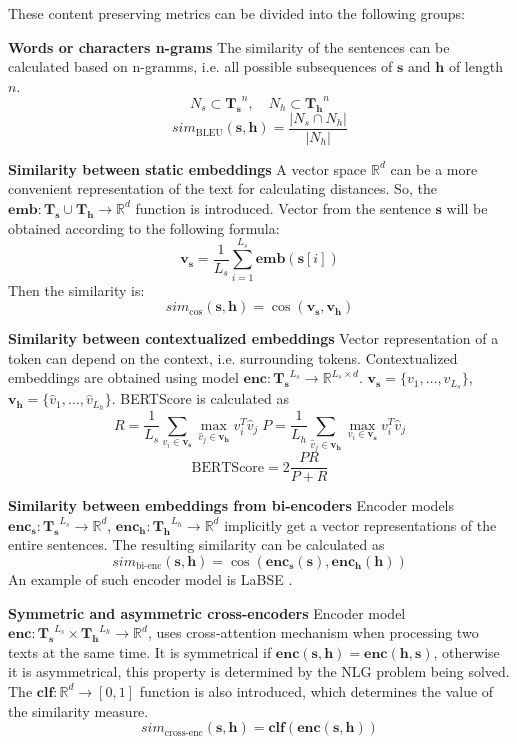 \documentclass[11pt]{article}
\begin{document}
These content preserving metrics can be divided into the following groups:

\textbf{Words or characters n-grams} The similarity of the sentences can be calculated based on n-gramms, i.e. all possible subsequences of $\mathbf{s}$ and $\mathbf{h}$ of length $n$. \[N_{s} \subset \mathbf{T_s}^{n}, \quad N_{h} \subset \mathbf{T_h}^{n} \]
\[sim_\text{BLEU}(\mathbf{s}, \mathbf{h}) = \frac{|N_{s} \cap N_{h}|}{|N_{h}|}\]

\textbf{Similarity between static embeddings} A vector space $\mathbb{R}^d$ can be a more convenient representation of the text for calculating distances. So, the $\mathbf{emb}: \mathbf{T_s} \cup \mathbf{T_h} \to \mathbb{R}^d$ function is introduced. Vector from the sentence $\mathbf{s}$ will be obtained according to the following formula: \[\mathbf{v_s} = \dfrac{1}{L_s} \sum\limits_{i=1}^{L_s} \mathbf{emb} (\mathbf{s}[i]) \]
Then the similarity is: \[sim_\text{cos}(\mathbf{s}, \mathbf{h}) = \cos (\mathbf{v_s}, \mathbf{v_h})\]

\textbf{Similarity between contextualized embeddings} Vector representation of a token can depend on the context, i.e. surrounding tokens. Contextualized embeddings are obtained using model $\mathbf{enc}: \mathbf{T_s}^{L_s} \to \mathbb{R}^{L_s \times d}$. $\mathbf{v_s} = \{v_1, \dots, v_{L_s}\}$, $\mathbf{v_h} = \{\hat{v}_1, \dots, \hat{v}_{L_h}\}$. BERTScore \cite{zhang-bertscore} is calculated as \[R = \dfrac{1}{L_s} \sum\limits_{v_i \in \mathbf{v_s}} \max\limits_{\hat{v}_j \in \mathbf{v_h}} v^T_i \hat{v}_j \; P = \dfrac{1}{L_h} \sum\limits_{\hat{v}_j \in \mathbf{v_h}} \max\limits_{v_i \in \mathbf{v_s}} v^T_i \hat{v}_j \] 
\[\text{BERTScore} = 2\dfrac{P R}{P + R}\]

\textbf{Similarity between embeddings from bi-encoders} Encoder models $\mathbf{enc_s}: \mathbf{T_s}^{L_s} \to \mathbb{R}^d$, $\mathbf{enc_h}: \mathbf{T_h}^{L_h} \to \mathbb{R}^d$ implicitly get a vector representations of the entire sentences. The resulting similarity can be calculated as \[sim_\text{bi-enc}(\mathbf{s}, \mathbf{h}) = \cos (\mathbf{enc_s}(\mathbf{s}), \mathbf{enc_h}(\mathbf{h}))\]
An example of such encoder model is LaBSE \cite{feng-etal-2022-language}.

\textbf{Symmetric and asymmetric cross-encoders} Encoder model $\mathbf{enc}: \mathbf{T_s}^{L_s} \times \mathbf{T_h}^{L_h} \to \mathbb{R}^d$, uses cross-attention mechanism \cite{vaswani-attention} when processing two texts at the same time. It is symmetrical if $\mathbf{enc}(\mathbf{s}, \mathbf{h}) = \mathbf{enc}(\mathbf{h}, \mathbf{s})$, otherwise it is asymmetrical, this property is determined by the NLG problem being solved. The $\mathbf{clf}: \mathbb{R}^d \to [0, 1]$ function is also introduced, which determines the value of the similarity measure. \[sim_\text{cross-enc}(\mathbf{s}, \mathbf{h}) = \mathbf{clf}(\mathbf{enc}(\mathbf{s}, \mathbf{h}))\]
\end{document}
